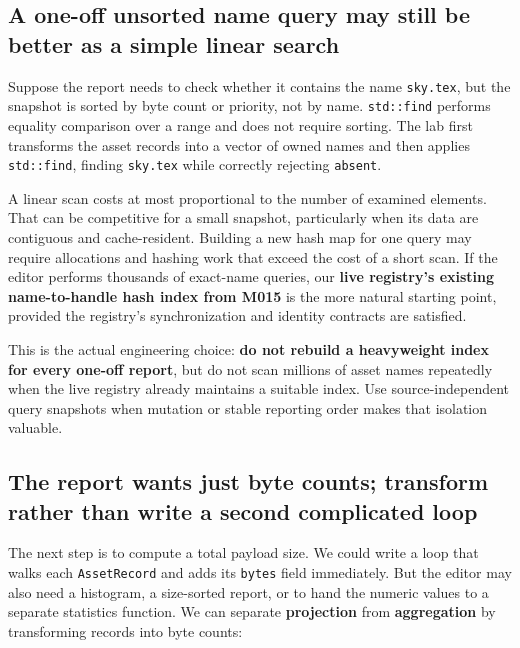 \subsection{A one-off unsorted name query may still be better as a simple linear search}\label{01-foundations-i-ch006-a-one-off-unsorted-name-query-may-still-be-better-as-a-simple-linear-search}

Suppose the report needs to check whether it contains the name \texttt{sky.tex}, but the snapshot is sorted by byte count or priority, not by name. \texttt{std::find} performs equality comparison over a range and does not require sorting. The lab first transforms the asset records into a vector of owned names and then applies \texttt{std::find}, finding \texttt{sky.tex} while correctly rejecting \texttt{absent}.

A linear scan costs at most proportional to the number of examined elements. That can be competitive for a small snapshot, particularly when its data are contiguous and cache-resident. Building a new hash map for one query may require allocations and hashing work that exceed the cost of a short scan. If the editor performs thousands of exact-name queries, our \textbf{live registry's existing name-to-handle hash index from M015} is the more natural starting point, provided the registry's synchronization and identity contracts are satisfied.

This is the actual engineering choice: \textbf{do not rebuild a heavyweight index for every one-off report}, but do not scan millions of asset names repeatedly when the live registry already maintains a suitable index. Use source-independent query snapshots when mutation or stable reporting order makes that isolation valuable.

\subsection{The report wants just byte counts; transform rather than write a second complicated loop}\label{01-foundations-i-ch006-the-report-wants-just-byte-counts-transform-rather-than-write-a-second-complicated-loop}

The next step is to compute a total payload size. We could write a loop that walks each \texttt{AssetRecord} and adds its \texttt{bytes} field immediately. But the editor may also need a histogram, a size-sorted report, or to hand the numeric values to a separate statistics function. We can separate \textbf{projection} from \textbf{aggregation} by transforming records into byte counts:


